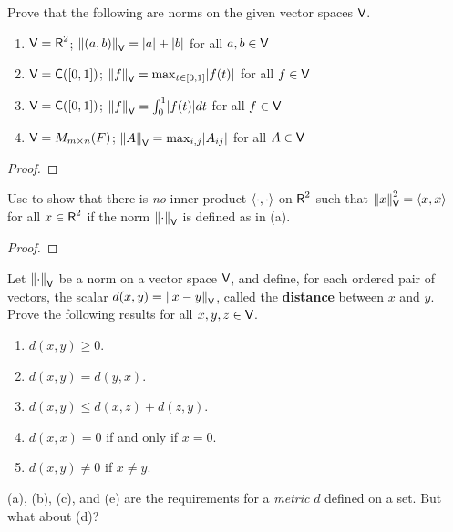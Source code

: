 \begin{exercise} \label{exercise 6.1.26}
Prove that the following are norms on the given vector spaces \(\textsf{V}\).
\begin{enumerate}
\item \(\textsf{V} = \textsf{R}^2\); \quad \(\left\lVert(a, b)\right\rVert_{\textsf{V}} = \lvert a\rvert + \lvert b\rvert\) for all \(a, b \in \textsf{V}\)
\item \(\textsf{V} = \textsf{C}([0, 1])\); \quad \(\left\lVert f\right\rVert_{\textsf{V}} = \max_{t \in [0, 1]} \lvert f(t)\rvert\) for all \(f \in \textsf{V}\)
\item \(\textsf{V} = \textsf{C}([0, 1])\); \(\left\lVert f\right\rVert_{\textsf{V}} = \int_0^1 \lvert f(t)\rvert dt\) for all \(f \in \textsf{V}\)
\item \(\textsf{V} = M_{m \times n}(F)\); \(\left\lVert A\right\rVert_{\textsf{V}} = \max_{i, j} \lvert A_{ij}\rvert\) for all \(A \in \textsf{V}\)
\end{enumerate}
\end{exercise}

\begin{proof}
\end{proof}

\begin{exercise} \label{exercise 6.1.27}
Use  to show that there is \emph{no} inner product \(\left< \cdot, \cdot \right>\) on \(\textsf{R}^2\) such that \(\left\lVert x\right\rVert_{\textsf{V}}^2 = \left< x, x \right>\) for all \(x \in \textsf{R}^2\) if the norm \(\left\lVert\cdot\right\rVert_{\textsf{V}}\) is defined as in (a).
\end{exercise}

\begin{proof}
\end{proof}

\begin{exercise} \label{exercise 6.1.28}
Let \(\left\lVert\cdot\right\rVert_{\textsf{V}}\) be a norm on a vector space \(\textsf{V}\), and define, for each ordered pair of vectors, the scalar \(d(x, y) = \left\lVert x - y\right\rVert_{\textsf{V}}\), called the \textbf{distance} between \(x\) and \(y\).
Prove the following results for all \(x, y, z \in \textsf{V}\).
\begin{enumerate}
\item \(d(x, y) \ge 0\).
\item \(d(x, y) = d(y, x)\).
\item \(d(x, y) \le d(x, z) + d(z, y)\).
\item \RED* \(d(x, x) = 0\) if and only if \(x = 0\).
\item \(d(x, y) \ne 0\) if \(x \ne y\).
\end{enumerate}
\end{exercise}

\begin{note}
(a), (b), (c), and (e) are the requirements for a \emph{metric} \(d\) defined on a set.
But what about (d)?
\end{note}

